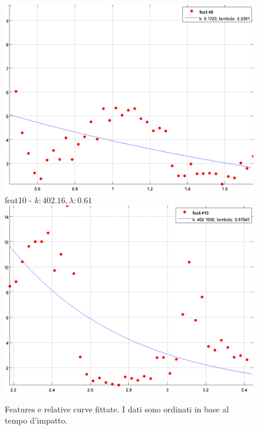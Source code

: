 \documentclass[12pt]{report}
\begin{document}
\begin{figure}[H]
\begin{minipage}[t]{0.5\linewidth}
	\includegraphics[scale=\imFeat]{images/feat8}\\
	feat10 - $k: 402.16, \lambda: 0.61 $\\
	\includegraphics[scale=\imFeat]{images/feat10}\\
\end{minipage}
\caption[short]{Features e relative curve fittate. I dati sono ordinati in base al tempo d'impatto.}
\label{fig:feats2}
\end{figure}
\end{document}
